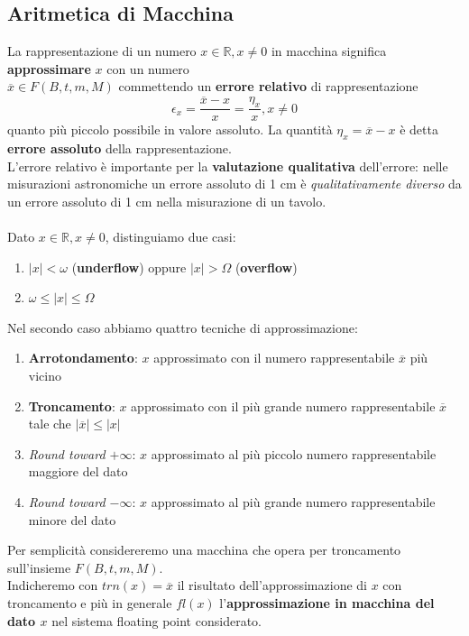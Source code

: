 \documentclass[10pt]{book}
\begin{document}
\subsection{Aritmetica di Macchina}
La rappresentazione di un numero $x \in \mathbb{R}, x \neq 0$ in macchina significa \textbf{approssimare} $x$ con un numero\\$\overline{x} \in F(B, t, m, M)$ commettendo un \textbf{errore relativo} di rappresentazione $$\epsilon_x = \frac{\overline{x} - x}{x} = \frac{\eta_x}{x}, x \neq 0$$ quanto più piccolo possibile in valore assoluto. La quantità $\eta_x = \overline{x} - x$ è detta \textbf{errore assoluto} della rappresentazione.\\
L'errore relativo è importante per la \textbf{valutazione qualitativa} dell'errore: nelle misurazioni astronomiche un errore assoluto di 1 cm è \textit{qualitativamente diverso} da un errore assoluto di 1 cm nella misurazione di un tavolo.\\\\
Dato $x \in \mathbb{R}, x \neq 0$, distinguiamo due casi:
\begin{enumerate}
	\item $|x| < \omega$ (\textbf{underflow}) oppure $|x| > \Omega$ (\textbf{overflow})
	\item $\omega \leq |x| \leq \Omega$
\end{enumerate}
\pagebreak
Nel secondo caso abbiamo quattro tecniche di approssimazione:
\begin{enumerate}
	\item \textbf{Arrotondamento}: $x$ approssimato con il numero rappresentabile $\overline{x}$ più vicino
	\item \textbf{Troncamento}: $x$ approssimato con il più grande numero rappresentabile $\overline{x}$ tale che $|\overline{x}| \leq |x|$
	\item \textit{Round toward $+\infty$}: $x$ approssimato al più piccolo numero rappresentabile maggiore del dato
	\item \textit{Round toward $-\infty$}: $x$ approssimato al più grande numero rappresentabile minore del dato
\end{enumerate}
Per semplicità considereremo una macchina che opera per troncamento sull'insieme $F(B, t, m, M)$.\\
Indicheremo con $trn(x) = \overline{x}$ il risultato dell'approssimazione di $x$ con troncamento e più in generale $fl(x)$ l'\textbf{approssimazione in macchina del dato $x$} nel sistema floating point considerato.
\end{document}
